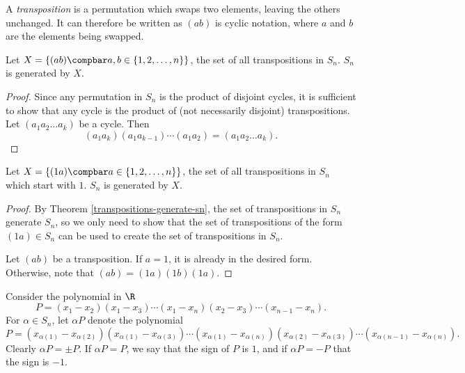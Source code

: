 \documentclass[12pt]{article}
\begin{document}
\begin{defn}
    A \emph{transposition} is a permutation which swaps two elements, leaving the others unchanged. It can therefore be written as $(ab)$ is cyclic notation, where $a$ and $b$ are the elements being swapped.
\end{defn}

\begin{thm}\label{transpositions-generate-sn}
    Let $X = \left\{(ab) \compbar a, b \in \{1, 2, \ldots, n\}\right\}$, the set of all transpositions in $S_n$. $S_n$ is generated by $X$.
\end{thm}

\begin{proof}
    Since any permutation in $S_n$ is the product of disjoint cycles, it is sufficient to show that any cycle is the product of (not necessarily disjoint) transpositions. Let $(a_1a_2\ldots a_k)$ be a cycle. Then
    \[(a_1a_k)(a_1a_{k-1})\cdots(a_1a_2) = (a_1a_2\ldots a_k).\]
\end{proof}

\begin{thm}\label{one-transpositions-generate-sn}
    Let $X = \left\{(1a) \compbar a \in \{1, 2, \ldots, n\}\right\}$, the set of all transpositions in $S_n$ which start with $1$. $S_n$ is generated by $X$.
\end{thm}

\begin{proof}
    By Theorem \ref{transpositions-generate-sn}, the set of transpositions in $S_n$ generate $S_n$, so we only need to show that the set of transpositions of the form $(1a) \in S_n$ can be used to create the set of transpositions in $S_n$.

    Let $(ab)$ be a transposition. If $a = 1$, it is already in the desired form. Otherwise, note that $(ab) = (1a)(1b)(1a)$.
\end{proof}

\begin{defn}
    Consider the polynomial in $\R$
    \[P = (x_1 - x_2)(x_1 - x_3)\cdots(x_1 - x_n)(x_2 - x_3)\cdots(x_{n-1} - x_n).\]
    For $\alpha \in S_n$, let $\alpha P$ denote the polynomial
    \[P = (x_{\alpha(1)} - x_{\alpha(2)})(x_{\alpha(1)} - x_{\alpha(3)})\cdots(x_{\alpha(1)} - x_{\alpha(n)})(x_{\alpha(2)} - x_{\alpha(3)})\cdots(x_{\alpha(n-1)} - x_{\alpha(n)}).\]
    Clearly $\alpha P = \pm P$. If $\alpha P = P$, we say that the sign of $P$ is $1$, and if $\alpha P = -P$ that the sign is $-1$.
\end{defn}
\end{document}

